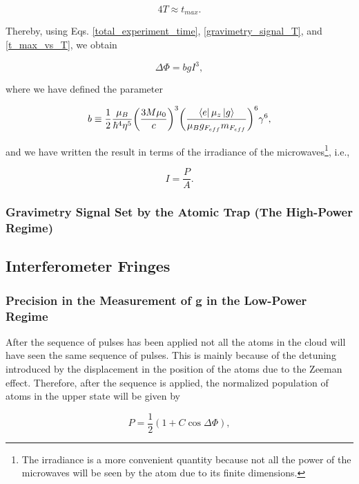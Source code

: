 \documentclass{article}
\begin{document}
\begin{equation}\label{t_max_vs_T}
    4T \approx t_{max}.
\end{equation}

Thereby, using Eqs. \ref{total_experiment_time}, \ref{gravimetry_signal_T}, and \ref{t_max_vs_T}, we obtain

\begin{equation}\label{gravimetry_signal_irradiance}
    \Delta \Phi = b g I^3, 
\end{equation}

where we have defined the parameter

\begin{equation}
    b \equiv \frac{1}{2} \frac{ \mu_{B}}{ \hbar^{4} \eta^{5}} \bigg(\frac{3M \mu_{0}}{c} \bigg)^{3} \bigg(\frac{\bra{e} \mu_{z} \ket{g}}{\mu_{B} g_{F_{eff}} m_{F_{eff}}} \bigg)^{6} \gamma^6,
\end{equation}

and we have written the result in terms of the irradiance of the microwaves\footnote{The irradiance is a more convenient quantity because not all the power of the microwaves will be seen by the atom due to its finite dimensions.}, i.e.,

\begin{equation}
    I = \frac{P}{A}.
\end{equation}

\subsubsection{Gravimetry Signal Set by the Atomic Trap (The High-Power Regime)}

\subsection{Interferometer Fringes}
\subsubsection{Precision in the Measurement of g in the Low-Power Regime}
After the sequence of pulses has been applied not all the atoms in the cloud will have seen the same sequence of pulses. This is mainly because of the detuning introduced by the displacement in the position of the atoms due to the Zeeman effect. Therefore, after the sequence is applied, the normalized population of atoms in the upper state will be given by

\begin{equation}\label{fringes_equation}
    P = \frac{1}{2}(1+C\cos{\Delta \Phi}),
\end{equation}
\end{document}
